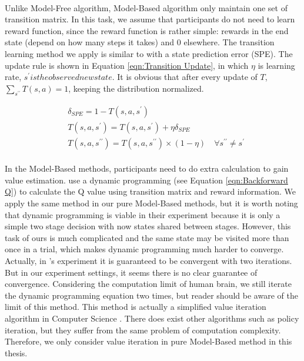 \paragraph{}
Unlike Model-Free algorithm, Model-Based algorithm only maintain one set of transition matrix. In this task, we assume that participants do not need to learn reward function, since the reward function is rather simple: rewards in the end state (depend on how many steps it takes) and 0 elsewhere. The transition learning method we apply is similar to \cite{glascher2010states} with a state prediction error (SPE). The update rule is shown in Equation \ref{eqn:Transition Update}, in which $\eta$ is learning rate, $s^{\prime} is the observed new state$. It is obvious that after every update of $T$, $\sum_{s^{\prime \prime}}T(s,a)=1$, keeping the distribution normalized. 

\begin{equation}
\begin{aligned}
&\delta_{SPE}=1-T(s,a,s^{\prime}) \\
&T(s,a,s^{\prime})=T(s,a,s^{\prime})+\eta \delta_{SPE} \\
&T(s,a,s^{\prime \prime})=T(s,a,s^{\prime \prime})\times(1-\eta) \quad \forall s^{\prime \prime} \neq s^{\prime}
\end{aligned}
\label{eqn:Transition Update}
\end{equation}

\paragraph{}
In the Model-Based methods, participants need to do extra calculation to gain value estimation. \citet{glascher2010states} use a dynamic programming (see Equation \ref{eqn:Backforward Q}) to calculate the Q value using transition matrix and reward information. We apply the same method in our pure Model-Based methods, but it is worth noting that dynamic programming is viable in their experiment because it is only a simple two stage decision with now states shared between stages. However, this task of ours is much complicated and the same state may be visited more than once in a trial, which makes dynamic programming much harder to converge. Actually, in \citeauthor{glascher2010states}'s experiment it is guaranteed to be convergent with two iterations. But in our experiment settings, it seems there is no clear guarantee of convergence. Considering the computation limit of human brain, we still iterate the dynamic programming equation two times, but reader should be aware of the limit of this method. This method is actually a simplified value iteration algorithm in Computer Science \cite{sutton1998introduction}. There does exist other algorithms such as policy iteration, but they suffer from the same problem of computation complexity. Therefore, we only consider value iteration in pure Model-Based method in this thesis. 

